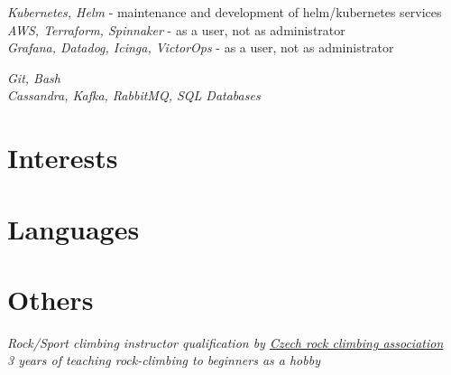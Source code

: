 \documentclass[10pt]{article} %
\begin{document}

{
\textit{Kubernetes, Helm} - maintenance and development of helm/kubernetes services\\
\textit{AWS, Terraform, Spinnaker} - as a user, not as administrator \\
\textit{Grafana, Datadog, Icinga, VictorOps} - as a user, not as administrator \\
}

{
\textit{Git, Bash} \\
\textit{Cassandra, Kafka, RabbitMQ, SQL Databases}
}



\section{Interests}



\section{Languages}



\section{Others}
{
\textit{Rock/Sport climbing instructor qualification by \href{https://www.horosvaz.cz/}{Czech rock climbing association}}\\
\textit{3 years of teaching rock-climbing to beginners as a hobby}
}
\end{document}
